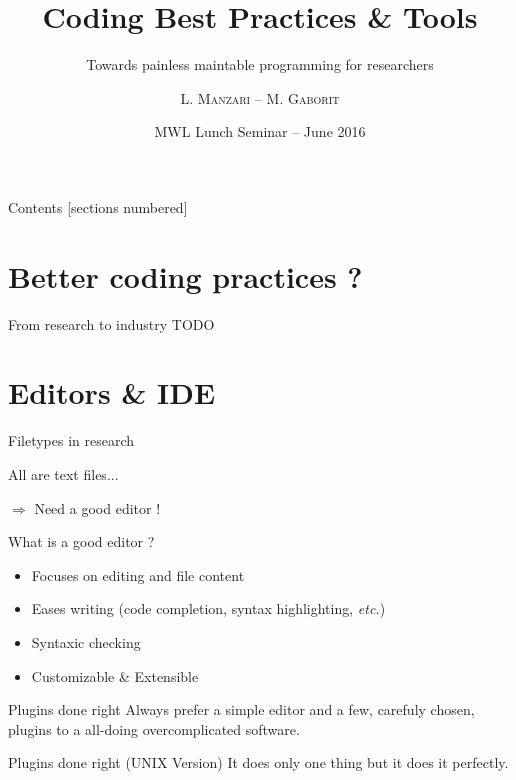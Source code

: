 \documentclass[10pt]{beamer}
\title{Coding Best Practices \& Tools}
\subtitle{Towards painless maintable programming for researchers}
\date{MWL Lunch Seminar -- June 2016}
\author{L. \textsc{Manzari} -- M. \textsc{Gaborit}}
\institute{}
\newcommand\fileimage[1]{%
	\draw (#1) -- ++(2,0) -- ++(0,2.5) -- ++(-1.5,0) -- ++(-.5,-.5) -- cycle;
}
\begin{document}
\maketitle

\begin{frame}{Contents}
	[sections numbered]
	\tableofcontents[hideallsubsections]
\end{frame}

\section{Better coding practices ?} %

\begin{frame}{From research to industry}
	TODO
\end{frame}

\section{Editors \& IDE} %

\begin{frame}{Filetypes in research} %

	\begin{center}
		\pause{}

		\Large
		All are \alert{text files}...
		\pause{}

		$\Rightarrow$ Need a good editor !
	\end{center}
\end{frame}

\begin{frame}{What is a good editor ?} %
	\begin{itemize}
		\item Focuses on editing and file content
		\item Eases writing (code completion, syntax highlighting, \textit{etc.})
		\item Syntaxic checking
		\item Customizable \& Extensible
	\end{itemize}

	\pause{}
	\begin{block}{Plugins done right} %
		Always prefer a simple editor and a few, carefuly chosen, plugins to a all-doing
		overcomplicated software.
	\end{block}

	\pause
	\begin{block}{Plugins done right (UNIX Version)}
		It does only one thing but it does it perfectly.
	\end{block}
\end{frame}
\end{document}
